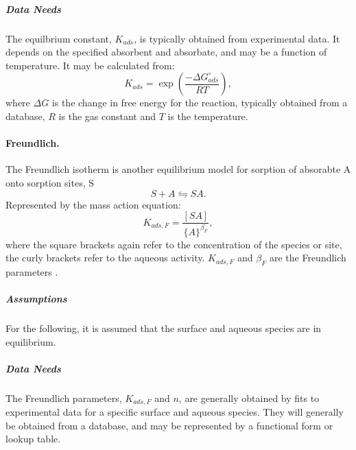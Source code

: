 \subparagraph{Data Needs} 
The equilbrium constant, $K_{ads}$, is typically obtained from experimental data. 
It depends on the specified absorbent and absorbate, and may be a function of temperature. 
It may be calculated from:
\begin{equation}
  K_{ads} = \exp\left(\frac{-\Delta G^{\circ}_{ads}}{RT}\right),
\end{equation}
where $\Delta G$ is the change in free energy for the reaction,
typically obtained from a database, $R$ is the gas constant and $T$ is the temperature.

\paragraph{Freundlich.} 
The Freundlich isotherm is another equilibrium model for sorption of absorabte A onto sorption sites, S
\begin{equation}  \label{eq:langmuir_reaction} 
  S + A \leftrightharpoons SA.
\end{equation}
Represented by the mass action equation:
\begin{equation}
  K_{ads,F} = \frac{ [ SA ] }{ \{A\}^{\beta_F} },
\end{equation}
where the square brackets again refer to the concentration of the
species or site, the curly brackets refer to the aqueous activity.
$K_{ads,F}$ and ${\beta_F}$ are the Freundlich parameters
\citep[e.g.][]{langmuir-1997, stumm-1992}.

\subparagraph{Assumptions} 
For the following, it is assumed that the surface and aqueous species are in equilibrium.

\subparagraph{Data Needs} 
The Freundlich parameters, $K_{ads,F}$ and $n$, are generally obtained by fits to experimental data 
for a specific surface and aqueous species. 
They will generally be obtained from a database, and 
may be represented by a functional form or lookup table.

